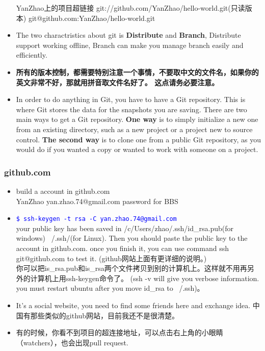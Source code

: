\documentclass[a4paper,12pt,twoside]{book}
\newcommand{\linuxcommand}[1]{\texttt{\textcolor{blue}{\$ #1 \Pisymbol{psy}{191}}}}
\begin{document}
\begin{CJK*}{UTF8}{song}
\begin{itemize}
YanZhao上的项目超链接
git://github.com/YanZhao/hello-world.git(只读版本) git@github.com:YanZhao/hello-world.git


\item The two charactristics about git is \textbf{Distribute} and \textbf{Branch}, Distribute support working offline, Branch can make you manage branch easily and efficiently.
\item \textbf{所有的版本控制，都需要特别注意一个事情，不要取中文的文件名，如果你的英文非常不好，那就用拼音取文件名好了。 这点请务必要注意。}
\item In order to do anything in Git, you have to have a Git repository. This is where Git stores the data for the snapshots you are saving. There are two main ways to get a Git repository. \textbf{One way} is to simply initialize a new one from an existing directory, such as a new project or a project new to source control. \textbf{The second way} is to clone one from a public Git repository, as you would do if you wanted a copy or wanted to work with someone on a project.
\end{itemize}

\subsubsection{github.com}
\begin{itemize}
	\item build a account in github.com \\
		  YanZhao  yan.zhao.74@gmail.com   password for BBS
	\item \linuxcommand{ssh-keygen -t rsa -C yan.zhao.74@gmail.com} \\
        	your public key has been saved in /c/Users/zhao/.ssh/id\_rsa.pub(for windows) ~/.ssh/(for Linux). Then you should paste the public key to the account in github.com. once you finish it, you can use command ssh git@github.com to test it. (github网站上面有更详细的说明。)\\ 你可以把is\_rsa.pub和is\_rsa两个文件拷贝到别的计算机上。这样就不用再另外的计算机上用ssh-keygen命令了。
         	(ssh -v will give you verbose information. you must restart ubuntu after you move id\_rsa to ~/.ssh)。
         

	\item It's a social website, you need to find some friends here and exchange idea. 中国有那些类似的github网站，目前我还不是很清楚。

    \item 有的时候，你看不到项目的超连接地址，可以点击右上角的小眼睛（watchers），也会出现pull request.
    

\end{itemize}
\end{CJK*}
\end{document}
